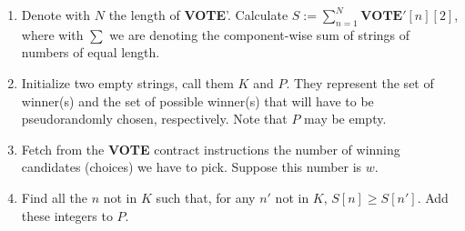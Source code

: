 \documentclass[submission, copyright,creativecommons,sharealike,noncommercial]{eptcs}
\newcommand{\Vote}{\textbf{VOTE}\xspace}
\begin{document}
	\begin{enumerate}
		\item Denote with $N$ the length of \Vote'. Calculate $S := \sum_{n=1}^N \Vote'[n][2]$, where with $\sum$ we are denoting the component-wise sum of strings of numbers of equal length.
		
		\item Initialize two empty strings, call them $K$ and $P$. They represent the set of winner(s) and the set of possible winner(s) that will have to be pseudorandomly chosen, respectively. Note that $P$ may be empty.
		
		\item Fetch from the \Vote contract instructions the number of winning candidates (choices) we have to pick. Suppose this number is $w$.
		
		\item Find all the $n$ not in $K$ such that, for any $n'$ not in $K$, $S[n] \geq S[n']$. Add these integers to $P$.
		

\end{enumerate}
\end{document}
